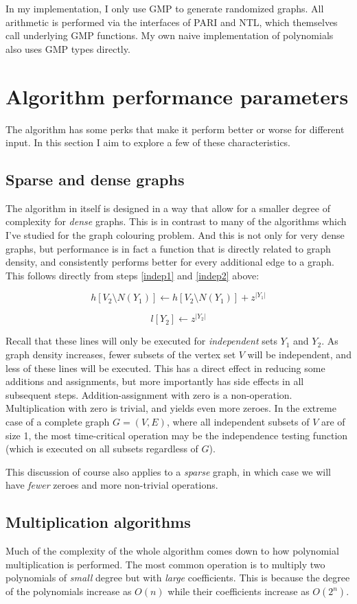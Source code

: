 \documentclass[a4paper]{article}
\begin{document}
In my implementation, I only use GMP to generate randomized graphs. All arithmetic is performed via the interfaces of PARI and NTL, which themselves call underlying GMP functions. My own naive implementation of polynomials also uses GMP types directly.

\section{Algorithm performance parameters}
The algorithm has some perks that make it perform better or worse for different input. In this section I aim to explore a few of these characteristics.

\subsection{Sparse and dense graphs}\label{sparsedense}
The algorithm in itself is designed in a way that allow for a smaller degree of complexity for \emph{dense} graphs. This is in contrast to many of the algorithms which I've studied for the graph colouring problem. And this is not only for very dense graphs, but performance is in fact a function that is directly related to graph density, and consistently performs better for every additional edge to a graph. This follows directly from steps \ref{indep1} and \ref{indep2} above:

$$ h[V_2 \setminus N(Y_1)] \leftarrow h[V_2 \setminus N(Y_1)] + z^{|Y_1|} $$

$$ l[Y_2] \leftarrow z^{|Y_2|} $$

Recall that these lines will only be executed for \emph{independent} sets $Y_1$ and $Y_2$. As graph density increases, fewer subsets of the vertex set $V$ will be independent, and less of these lines will be executed. This has a direct effect in reducing some additions and assignments, but more importantly has side effects in all subsequent steps. Addition-assignment with zero is a non-operation. Multiplication with zero is trivial, and yields even more zeroes. In the extreme case of a complete graph $G=(V,E)$, where all independent subsets of $V$ are of size 1, the most time-critical operation may be the independence testing function (which is executed on all subsets regardless of $G$).

This discussion of course also applies to a \emph{sparse} graph, in which case we will have \emph{fewer} zeroes and more non-trivial operations.

\subsection{Multiplication algorithms}
Much of the complexity of the whole algorithm comes down to how polynomial multiplication is performed. The most common operation is to multiply two polynomials of \emph{small} degree but with \emph{large} coefficients. This is because the degree of the polynomials increase as $O(n)$ while their coefficients increase as $O(2^n)$. %
\end{document}

